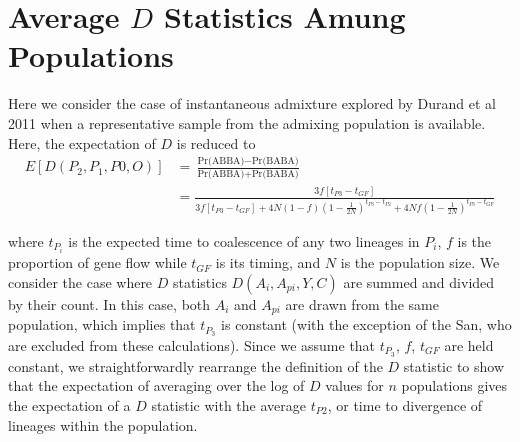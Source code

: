 \documentclass{article}
\begin{document}
\newpage
\section{Average $D$ Statistics Amung Populations}

Here we consider the case of instantaneous admixture explored by Durand et al 2011 when a representative sample from the admixing population is available. Here, the expectation of $D$ is reduced to 
\small 
$$ \begin{aligned} E[  D(P_2, P_1, P0, O)] 
	&= \frac{\text{Pr(ABBA)} - \text{Pr(BABA)}}{\text{Pr(ABBA)} + \text{Pr(BABA)}} \\
&= \frac{3f[t_{P3} - t_{GF}]}{3f [t_{P3} - t_{GF}] + 4N(1-f) (1 - \frac{1}{2N})^{t_{P3}-  t_{P2}} + 4Nf (1 - \frac{1}{2N})^{t_{P3}-t_{GF}}} \end{aligned}$$

where $t_{P_i}$ is the expected time to coalescence of any two lineages in $P_i$, $f$ is the proportion of gene flow while $t_{GF}$ is its timing, and $N$ is the population size. We consider the case where $D$ statistics $D(A_i, A_{pi}, Y, C)$ are summed and divided by their count. In this case, both $A_i$ and $A_{pi}$ are drawn from the same population, which implies that $t_{P_3}$ is constant (with the exception of the San, who are excluded from these calculations). Since we assume that $t_{P_3}$, $f$, $t_{GF}$ are held constant, we straightforwardly rearrange the definition of the $D$ statistic to show that the expectation of averaging over the log of $D$ values for $n$ populations gives the expectation of a $D$ statistic with the average $t_{P2}$, or time to divergence of lineages within the population.  
\end{document}
